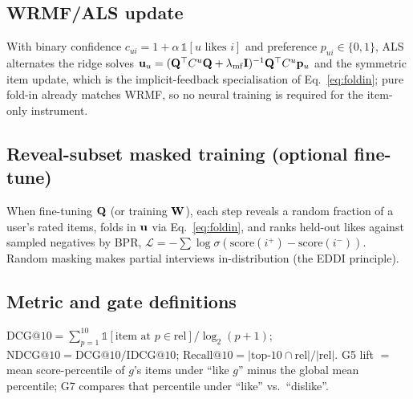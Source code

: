 \subsection{WRMF/ALS update}
With binary confidence $c_{ui}=1+\alpha\,\mathbb 1[u\text{ likes }i]$ and preference $p_{ui}\in\{0,1\}$, ALS
alternates the ridge solves
$\mathbf{u}_u=(\mathbf{Q}^\top C^u\mathbf{Q}+\lambda_{\mathrm{mf}}\mathbf{I})^{-1}\mathbf{Q}^\top C^u\mathbf p_u$ and the symmetric item update, which is
the implicit-feedback specialisation of Eq.~\eqref{eq:foldin}; pure fold-in already matches WRMF, so no neural
training is required for the item-only instrument.

\subsection{Reveal-subset masked training (optional fine-tune)}
When fine-tuning $\mathbf{Q}$ (or training $\mathbf{W}$), each step reveals a random fraction of a user's rated items, folds in
$\mathbf{u}$ via Eq.~\eqref{eq:foldin}, and ranks held-out likes against sampled negatives by BPR,
$\mathcal L=-\sum\log\sigma(\mathrm{score}(i^+)-\mathrm{score}(i^-))$. Random masking makes partial interviews
in-distribution (the EDDI principle).

\subsection{Metric and gate definitions}
$\mathrm{DCG@10}=\sum_{p=1}^{10}\mathbb 1[\text{item at }p\in\mathrm{rel}]/\log_2(p+1)$;
$\mathrm{NDCG@10}=\mathrm{DCG@10}/\mathrm{IDCG@10}$; $\mathrm{Recall@10}=|\text{top-}10\cap\mathrm{rel}|/|\mathrm{rel}|$.
G5 lift $=$ mean score-percentile of $g$'s items under ``like $g$'' minus the global mean percentile; G7 compares
that percentile under ``like'' vs.\ ``dislike''.

